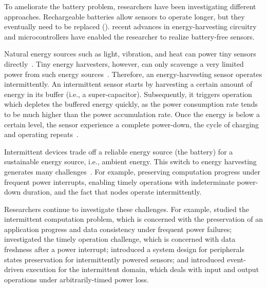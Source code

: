 To ameliorate the battery problem, researchers have been investigating different approaches. Rechargeable batteries allow sensors to operate longer, but they eventually need to be replaced ().
recent advances in energy-harvesting circuitry and microcontrollers have enabled the researcher to realize battery-free sensors. 

Natural energy sources such as light, vibration, and heat can power tiny sensors directly~\cite{margolies2016panda, gorlatova2014movers, gorlatova2010energy, gollakota2014emergence}. Tiny energy harvesters, however, can only scavenge a very limited power from such energy sources~\cite{liu2013ambient}. Therefore, an energy-harvesting sensor operates intermittently. An intermittent sensor starts by harvesting a certain amount of energy in its buffer (i.e., a super-capacitor). Subsequently, it triggers operation which depletes the buffered energy quickly, as the power consumption rate tends to be much higher than the power accumulation rate. Once the energy is below a certain level, the sensor experience a complete power-down, the cycle of charging and operating %
repeats~\cite{colin2018reconfigurable}.

Intermittent devices trade off a reliable energy source (the battery) for a sustainable
energy source, i.e., ambient energy. This switch to energy harvesting generates many challenges~\cite{lucia2017intermittent}. For example, preserving computation progress under frequent power interrupts, enabling timely operations with indeterminate power-down duration, and the fact that nodes operate intermittently. 

Researchers continue to investigate these challenges. For example, \cite{lucia2017intermittent,mementos,dino,colin2016chain,balsamo2015hibernus} studied the intermittent computation problem, which is concerned with the preservation of an application progress and data consistency under frequent power failures; \cite{hester2017timely} investigated the timely operation challenge, which is concerned with data freshness after a power interrupt; \cite{samoyed_pldi_2019} introduced a system design for peripherals states preservation for intermittently powered sensors;  and \cite{yildirim2018ink} introduced event-driven execution for the intermittent domain, which deals with input and output operations under arbitrarily-timed power loss.

